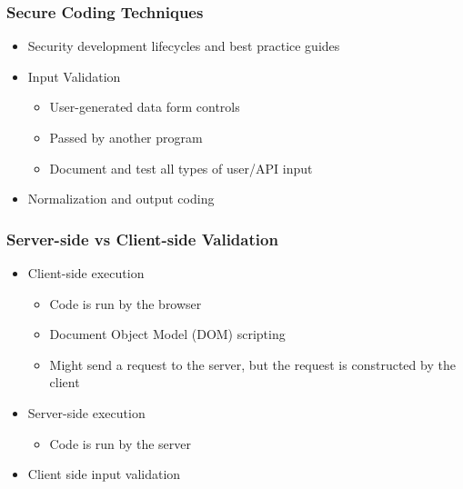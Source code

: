 		\subsubsection {Secure Coding Techniques}
			\begin{itemize}
				\item Security development lifecycles and best practice guides
				\item Input Validation
					\begin{itemize}
						\item User-generated data form controls
						\item Passed by another program
						\item Document and test all types of user/API input
					\end{itemize}
				\item Normalization and output coding
			\end{itemize}
		\subsubsection {Server-side vs Client-side Validation}
			\begin{itemize}
				\item Client-side execution
					\begin{itemize}
						\item Code is run by the browser
						\item Document Object Model (DOM) scripting
						\item Might send a request to the server, but the request
							is constructed by the client
					\end{itemize}
				\item Server-side execution
					\begin{itemize}
						\item Code is run by the server
					\end{itemize}
				\item Client side input validation
			\end{itemize}
